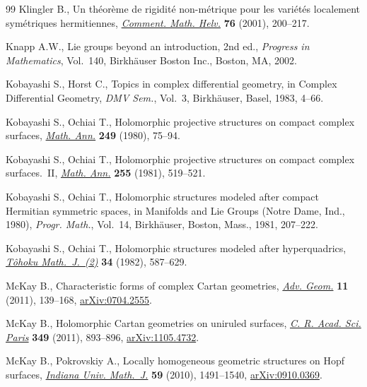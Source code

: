 \documentclass[pdftex]{sigma}
\begin{document}
\begin{thebibliography}{99}
Klingler B.,
Un th\'eor\`eme de rigidit\'e non-m\'etrique pour les vari\'et\'es localement sym\'etriques hermitiennes,
\href{http://dx.doi.org/10.1007/s00014-001-8320-0}{{\em Comment. Math. Helv.}} {\bf 76} (2001), 200--217.

 Knapp A.W.,
Lie groups beyond an introduction, 2nd ed.,
 {\em Progress   in Mathematics}, Vol.~140,
  Birkh\"auser Boston Inc., Boston, MA, 2002.

  Kobayashi S.,  Horst C.,
 Topics in complex dif\/ferential geometry,
in  Complex Dif\/ferential Geometry,   {\em DMV Sem.}, Vol.~3,
 Birkh\"auser, Basel, 1983, 4--66.

 Kobayashi S., Ochiai T.,
Holomorphic projective structures on compact complex surfaces,
\href{http://dx.doi.org/10.1007/BF01387081}{{\em Math. Ann.}} {\bf 249} (1980), 75--94.

Kobayashi S., Ochiai T.,
 Holomorphic projective structures on compact complex surfaces.~II,
\href{http://dx.doi.org/10.1007/BF01451931}{{\em Math. Ann.}} {\bf 255} (1981), 519--521.

Kobayashi S., Ochiai T.,
 Holomorphic structures modeled after compact Hermitian symmetric spaces,
in Manifolds and Lie Groups (Notre Dame, Ind., 1980),
 {\em Progr. Math.}, Vol.~14,  Birkh\"auser, Boston, Mass., 1981, 207--222.

Kobayashi S., Ochiai T.,
 Holomorphic structures modeled after hyperquadrics,
\href{http://dx.doi.org/10.2748/tmj/1178229159}{{\em T\^ohoku Math.~J.~(2)}} {\bf 34} (1982), 587--629.

 McKay B.,
 Characteristic forms of complex Cartan geometries,
\href{http://dx.doi.org/10.1515/ADVGEOM.2010.044}{{\em Adv. Geom.}} {\bf 11} (2011), 139--168,
\href{http://arxiv.org/abs/0704.2555}{arXiv:0704.2555}.

McKay B.,
Holomorphic Cartan geometries on uniruled surfaces,
\href{http://dx.doi.org/10.1016/j.crma.2011.07.021}{{\em C. R. Acad. Sci. Paris}} {\bf 349} (2011), 893--896,
\href{http://arxiv.org/abs/1105.4732}{arXiv:1105.4732}.

McKay B.,   Pokrovskiy A.,
 Locally homogeneous geometric structures on Hopf surfaces,
\href{http://dx.doi.org/10.1512/iumj.2010.59.4178}{{\em Indiana Univ. Math.~J.}} {\bf 59} (2010), 1491--1540,
\href{http://arxiv.org/abs/0910.0369}{arXiv:0910.0369}.


\end{thebibliography}
\end{document}
